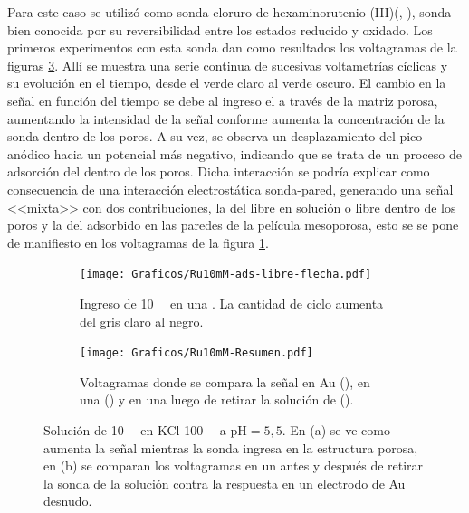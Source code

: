 		Para este caso se utilizó como sonda cloruro de hexaminorutenio (III)\linebreak (\aminorutenioCompleto, \ru), sonda bien conocida por su reversibilidad entre los estados reducido y oxidado. Los primeros experimentos con esta sonda dan como resultados los voltagramas de la figuras \ref{fig:primero-Ru10mM}. Allí se muestra una serie continua de sucesivas voltametrías cíclicas y su evolución en el tiempo, desde el verde claro al verde oscuro. El cambio en la señal en función del tiempo se debe al ingreso el \ru\space a través de la matriz porosa, aumentando la intensidad de la señal conforme aumenta la concentración de la sonda dentro de los poros. A su vez, se observa un desplazamiento del pico anódico hacia un potencial más negativo, indicando que se trata de un proceso de adsorción del \ru\space dentro de los poros. Dicha interacción se podría explicar como consecuencia de una interacción electrostática sonda-pared, generando una señal <<mixta>> con dos contribuciones, la del \ru\space libre en solución o libre dentro de los poros y la del adsorbido en las paredes de la película mesoporosa, esto se se pone de manifiesto en los voltagramas de la figura \ref{fig:Ru10mM_ingreso}.

			\begin{figure}[th]
				\begin{subfigure}[t]{0.495\textwidth}
				\texttt{[image: Graficos/Ru10mM-ads-libre-flecha.pdf]}
		        \caption{Ingreso de \ru\space \SI{10}{\milli\Molar} en una \pdmF. La cantidad de ciclo aumenta del gris  claro al negro.}
		        \label{fig:Ru10mM_ingreso}
		      	\end{subfigure}
		      	\begin{subfigure}[t]{0.495\textwidth}
				\texttt{[image: Graficos/Ru10mM-Resumen.pdf]}
		        \caption{Voltagramas donde se compara la señal en Au (\usebox{\punteado}), en una \pdmF\space(\usebox{\gris}) y en una \pdmF\space luego de retirar la solución de \ru (\usebox{\negro}).}
		        \label{fig:Ru10mM-resumen}
		      	\end{subfigure}
		      	\caption[Adsorción de sonda positiva en \pdmF]{Solución de \ru\space \SI{10}{\milli\Molar} en KCl \SI{100}{\milli\Molar} a $\text{pH}=5,5$. En (a) se ve como aumenta la señal mientras la sonda ingresa en la estructura porosa, en (b) se comparan los voltagramas en un \pdmF\space antes y después de retirar la sonda de la solución contra la respuesta en un electrodo de Au desnudo.}
		      	\label{fig:primero-Ru10mM}
		      	\end{figure}

